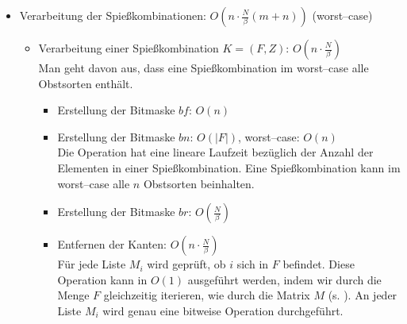 \begin{itemize}
\begin{itemize}
    \item Erstellung der Adjazenzmatrix $M$: $O(n \cdot \frac{N}{\beta})$

    \item Die gesamte Laufzeit für diesen Teil beträgt für den worst--case: 
    $O(n) + O(N) + O(w) + O(w \log w) + O(m \cdot n \log n) + O(n^2) + O(N) + O(w \cdot n) + O(n^2 \log n) + 
    O(n \cdot \frac{N}{\beta})
    = O(n + N + w + w \log w + m \cdot n \log n + n^2 + N + w \cdot n + n^2 \log n + n \cdot \frac{N}{\beta})
    = O(n(\log n(m + n) + w + \frac{N}{\beta}))$

    \item Die gesamte Laufzeit für diesen Teil beträgt für den average--case:
    $O(n) + O(N) + O(w) + O(w \log w) + O(m \cdot n \log n) + O(n) + O(N) + O(w \log w) + O(n \log n) 
    + O(n \cdot \frac{N}{\beta})
    = O(n + N + w + w \log w + m \cdot n \log n + n + N + w \log w + n \log n + n \cdot \frac{N}{\beta})
    = O(w \log w + n (m \log n + \frac{N}{\beta}))$

  \end{itemize}

  \item Verarbeitung der Spießkombinationen: $O(n\cdot \frac{N}{\beta}(m + n))$ (worst--case)
  \begin{itemize}
    \item Verarbeitung einer Spießkombination $K = (F, Z)$: $O(n \cdot\frac{N}{\beta})$\\
    Man geht davon aus, dass eine Spießkombination im worst--case alle Obstsorten enthält.
    \begin{itemize}
      \item Erstellung der Bitmaske $bf$: $O(n)$

      \item Erstellung der Bitmaske $bn$: $O(|F|)$, worst--case: $O(n)$\\
      Die Operation hat eine lineare Laufzeit bezüglich der Anzahl der Elementen in 
      einer Spießkombination. Eine Spießkombination kann im worst--case alle $n$
      Obstsorten beinhalten.

      \item Erstellung der Bitmaske $br$: $O(\frac{N}{\beta})$

      \item Entfernen der Kanten: $O(n \cdot \frac{N}{\beta})$\\
      Für jede Liste $M_i$ wird geprüft, ob $i$ sich in $F$ befindet.
      Diese Operation kann in $O(1)$ ausgeführt werden, indem wir durch
      die Menge $F$ gleichzeitig iterieren, wie durch die Matrix $M$ (s. ).
      An jeder Liste $M_i$ wird genau eine bitweise Operation durchgeführt.


\end{itemize}
\end{itemize}
\end{itemize}
